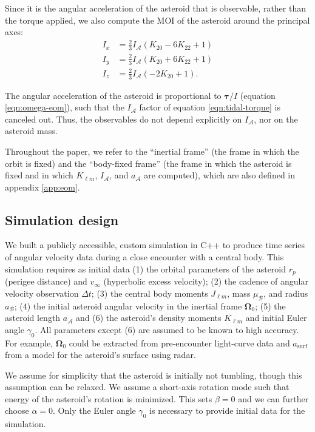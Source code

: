 \documentclass[fleqn,usenatbib]{mnras}
\newcommand{\parens}[1]{\left( #1 \right)}
\begin{document}
Since it is the angular acceleration of the asteroid that is observable, rather than the torque applied, we also compute the MOI of the asteroid around the principal axes: 
\begin{equation}
  \begin{split}
    I_x &= \frac{2}{3} I_\mathcal{A} \parens{K_{20} - 6 K_{22} + 1}\\
    I_y &= \frac{2}{3} I_\mathcal{A} \parens{K_{20} + 6 K_{22} + 1}\\
    I_z &= \frac{2}{3} I_\mathcal{A} \parens{-2K_{20} + 1}.
  \end{split}
  \label{eqn:moi}
\end{equation}

The angular acceleration of the asteroid is proportional to $\bm \tau / I$ (equation \ref{eqn:omega-eom}), such that the $I_\mathcal{A}$ factor of equation \ref{eqn:tidal-torque} is canceled out. Thus, the observables do not depend explicitly on $I_\mathcal{A}$, nor on the asteroid mass.

Throughout the paper, we refer to the ``inertial frame'' (the frame in which the orbit is fixed) and the ``body-fixed frame'' (the frame in which the asteroid is fixed and in which $K_{\ell m}$, $I_\mathcal{A}$, and $a_\mathcal{A}$ are computed), which are also defined in appendix \ref{app:eom}.

\subsection{Simulation design}
\label{sec:sim}

We built a publicly accessible, custom simulation in C++ to produce time series of angular velocity data during a close encounter with a central body. This simulation requires as initial data (1) the orbital parameters of the asteroid $r_p$ (perigee distance) and $v_\infty$ (hyperbolic excess velocity); (2) the cadence of angular velocity observation $\Delta t$; (3) the central body moments $J_{\ell m}$, mass $\mu_\mathcal{B}$, and radius $a_\mathcal{B}$; (4) the initial asteroid angular velocity in the inertial frame $\bm \Omega_0$; (5) the asteroid length $a_\mathcal{A}$ and (6) the asteroid's density moments $K_{\ell m}$ and initial Euler angle $\gamma_0$. All parameters except (6) are assumed to be known to high accuracy. For example, $\bm \Omega_0$ could be extracted from pre-encounter light-curve data and $a_\text{surf}$ from a model for the asteroid's surface using radar.

We assume for simplicity that the asteroid is initially not tumbling, though this assumption can be relaxed. We assume a short-axis rotation mode such that energy of the asteroid's rotation is minimized. This sets $\beta = 0$ and we can further choose $\alpha = 0$. Only the Euler angle $\gamma_0$ is necessary to provide initial data for the simulation.
\end{document}

